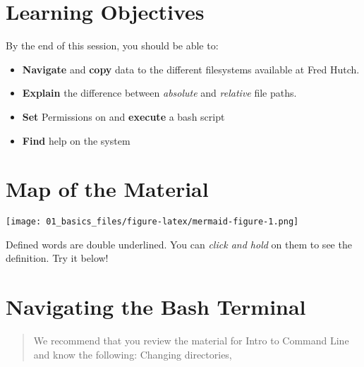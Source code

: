 \documentclass[
  letterpaper,
  DIV=11,
  numbers=noendperiod]{scrreprt}
\providecommand{\tightlist}{%
  \setlength{\itemsep}{0pt}\setlength{\parskip}{0pt}}
\begin{document}
\section{Learning Objectives}\label{learning-objectives-1}

By the end of this session, you should be able to:

\begin{itemize}
\tightlist
\item
  \textbf{Navigate} and \textbf{copy} data to the different filesystems
  available at Fred Hutch.
\item
  \textbf{Explain} the difference between \emph{absolute} and
  \emph{relative} file paths.
\item
  \textbf{Set} Permissions on and \textbf{execute} a bash script
\item
  \textbf{Find} help on the system
\end{itemize}

\section{Map of the Material}\label{map-of-the-material}

\texttt{[image: 01\_basics\_files/figure-latex/mermaid-figure-1.png]}

\begin{tcolorbox}[enhanced jigsaw, colbacktitle=quarto-callout-note-color!10!white, left=2mm, toprule=.15mm, toptitle=1mm, opacityback=0, bottomrule=.15mm, breakable, leftrule=.75mm, colframe=quarto-callout-note-color-frame, bottomtitle=1mm, titlerule=0mm, coltitle=black, title=\textcolor{quarto-callout-note-color}{\faInfo}\hspace{0.5em}{Reminder about Terminology}, rightrule=.15mm, arc=.35mm, opacitybacktitle=0.6, colback=white]

Defined words are double underlined. You can \emph{click and hold} on
them to see the definition. Try it below!

\end{tcolorbox}

\section{Navigating the Bash
Terminal}\label{navigating-the-bash-terminal}

\begin{quote}
We recommend that you review the material for Intro to Command Line and
know the following: Changing directories,
\end{quote}
\end{document}
